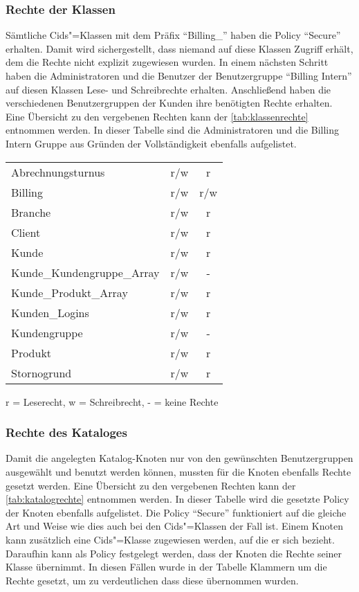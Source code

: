 \subsubsection{Rechte der Klassen}
Sämtliche Cids"=Klassen mit dem Präfix "`Billing\_"' haben die Policy "`Secure"' erhalten. Damit wird sichergestellt, dass niemand auf diese Klassen Zugriff erhält, dem die Rechte nicht explizit zugewiesen wurden.
In einem nächsten Schritt haben die Administratoren und die Benutzer der Benutzergruppe "`Billing Intern"' auf diesen Klassen Lese- und Schreibrechte erhalten.
Anschließend haben die verschiedenen Benutzergruppen der Kunden ihre benötigten Rechte erhalten.
Eine Übersicht zu den vergebenen Rechten kann der \autoref{tab:klassenrechte} entnommen werden.
In dieser Tabelle sind die Administratoren und die Billing Intern Gruppe aus Gründen der Vollständigkeit ebenfalls aufgelistet.

\begin{minipage}{\linewidth}
\centering
{} \label{tab:klassenrechte}
\begin{tabulary}{\textwidth}{|l|C|c|}
 \hline
  &  &  \tabularnewline
 \hline
 Abrechnungsturnus
  & r/w & r \\ 
 \hline 
 Billing & r/w & r/w \\ 
 \hline 
 Branche & r/w & r \\ 
 \hline 
 Client & r/w & r \\ 
 \hline 
 Kunde & r/w & r \\ 
 \hline 
 Kunde\_Kundengruppe\_Array & r/w & - \\ 
 \hline 
 Kunde\_Produkt\_Array & r/w & r \\ 
 \hline 
 Kunden\_Logins & r/w & r \\ 
 \hline 
 Kundengruppe & r/w & - \\ 
 \hline 
 Produkt & r/w & r \\ 
 \hline 
 Stornogrund & r/w & r \\ 
 \hline 
 \end{tabulary}
 \par
 \bigskip
 r = Leserecht, w = Schreibrecht, - = keine Rechte
 \end{minipage}
 
\subsubsection{Rechte des Kataloges}
Damit die angelegten Katalog-Knoten nur von den gewünschten Benutzergruppen ausgewählt und benutzt werden können, mussten für die Knoten ebenfalls Rechte gesetzt werden.
Eine Übersicht zu den vergebenen Rechten kann der \autoref{tab:katalogrechte} entnommen werden.
In dieser Tabelle wird die gesetzte Policy der Knoten ebenfalls aufgelistet.
Die Policy "`Secure"' funktioniert auf die gleiche Art und Weise wie dies auch bei den Cids"=Klassen der Fall ist.
Einem Knoten kann zusätzlich eine Cids"=Klasse zugewiesen werden, auf die er sich bezieht.
Daraufhin kann als Policy festgelegt werden, dass der Knoten die Rechte seiner Klasse übernimmt.
In diesen Fällen wurde in der Tabelle Klammern um die Rechte gesetzt, um zu verdeutlichen dass diese übernommen wurden.


